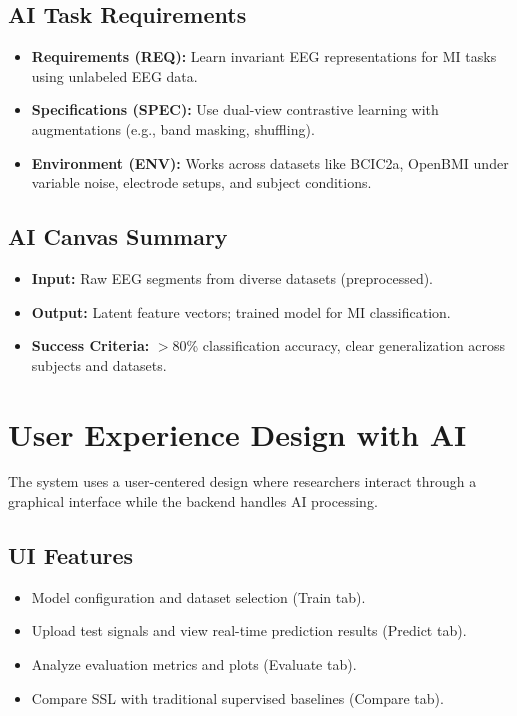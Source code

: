 \subsection{AI Task Requirements}
\begin{itemize}
    \item \textbf{Requirements (REQ):} Learn invariant EEG representations for MI tasks using unlabeled EEG data.
    \item \textbf{Specifications (SPEC):} Use dual-view contrastive learning with augmentations (e.g., band masking, shuffling).
    \item \textbf{Environment (ENV):} Works across datasets like BCIC2a, OpenBMI under variable noise, electrode setups, and subject conditions.
\end{itemize}

\subsection{AI Canvas Summary}
\begin{itemize}
    \item \textbf{Input:} Raw EEG segments from diverse datasets (preprocessed).
    \item \textbf{Output:} Latent feature vectors; trained model for MI classification.
    \item \textbf{Success Criteria:} $>$80\% classification accuracy, clear generalization across subjects and datasets.
\end{itemize}

\section{User Experience Design with AI}
\label{sec:ux-ai}

The system uses a user-centered design where researchers interact through a graphical interface while the backend handles AI processing.

\subsection*{UI Features}
\begin{itemize}
    \item Model configuration and dataset selection (Train tab).
    \item Upload test signals and view real-time prediction results (Predict tab).
    \item Analyze evaluation metrics and plots (Evaluate tab).
    \item Compare SSL with traditional supervised baselines (Compare tab).
\end{itemize}

